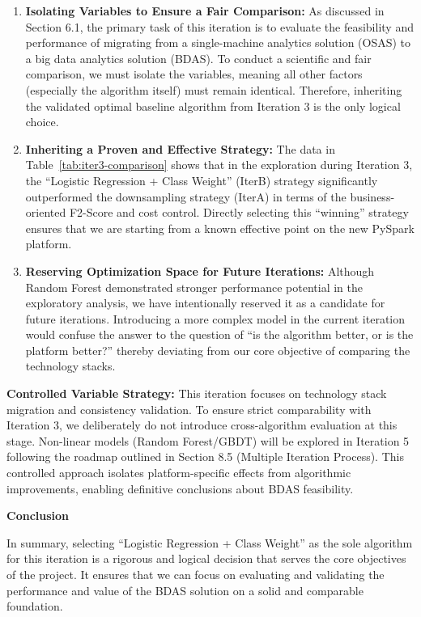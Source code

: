 \documentclass[sigplan,screen]{acmart}
\begin{document}
\begin{enumerate}
\item \textbf{Isolating Variables to Ensure a Fair Comparison:} As discussed in Section 6.1, the primary task of this iteration is to evaluate the feasibility and performance of migrating from a single-machine analytics solution (OSAS) to a big data analytics solution (BDAS). To conduct a scientific and fair comparison, we must isolate the variables, meaning all other factors (especially the algorithm itself) must remain identical. Therefore, inheriting the validated optimal baseline algorithm from Iteration 3 is the only logical choice.

\item \textbf{Inheriting a Proven and Effective Strategy:} The data in Table~\ref{tab:iter3-comparison} shows that in the exploration during Iteration 3, the ``Logistic Regression + Class Weight'' (IterB) strategy significantly outperformed the downsampling strategy (IterA) in terms of the business-oriented F2-Score and cost control. Directly selecting this ``winning'' strategy ensures that we are starting from a known effective point on the new PySpark platform.

\item \textbf{Reserving Optimization Space for Future Iterations:} Although Random Forest demonstrated stronger performance potential in the exploratory analysis, we have intentionally reserved it as a candidate for future iterations. Introducing a more complex model in the current iteration would confuse the answer to the question of ``is the algorithm better, or is the platform better?'' thereby deviating from our core objective of comparing the technology stacks.
\end{enumerate}

\textbf{Controlled Variable Strategy:} This iteration focuses on technology stack migration and consistency validation. To ensure strict comparability with Iteration 3, we deliberately do not introduce cross-algorithm evaluation at this stage. Non-linear models (Random Forest/GBDT) will be explored in Iteration 5 following the roadmap outlined in Section 8.5 (Multiple Iteration Process). This controlled approach isolates platform-specific effects from algorithmic improvements, enabling definitive conclusions about BDAS feasibility.

\textbf{Conclusion}

In summary, selecting ``Logistic Regression + Class Weight'' as the sole algorithm for this iteration is a rigorous and logical decision that serves the core objectives of the project. It ensures that we can focus on evaluating and validating the performance and value of the BDAS solution on a solid and comparable foundation.
\end{document}

